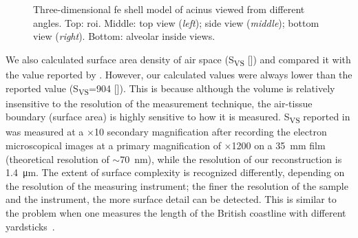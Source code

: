 \begin{figure}[htb]
%
	\caption[\threed \acs{fe} shell model of a partial acinus]{Three-dimensional \ac{fe} shell model of acinus viewed from different angles. Top: \ac{roi}. Middle: top view (\emph{left}); side view (\emph{middle}); bottom view (\emph{right}). Bottom: alveolar inside views.}
	\label{fig:alveolus}
\end{figure}%

We also calculated surface area density of air space (S\textsubscript{VS} [\centimetresquared\per\centimetrecubed]) and compared it with the value reported by \cite{Tschanz2003}. However, our calculated values were always lower than the reported value (S\textsubscript{VS}=904 [\centimetresquared\per\centimetrecubed]). This is because although the volume is relatively insensitive to the resolution of the measurement technique, the air-tissue boundary (surface area) is highly sensitive to how it is measured. S\textsubscript{VS} reported in \citet{Tschanz2003} was measured at a $\times$10 secondary magnification after recording the electron microscopical images at a primary magnification of $\times$1200 on a \SI{35}{\milli\meter} film (theoretical resolution of $\sim$\SI{70}{\nano\meter}), while the resolution of our \threed reconstruction is \SI{1.4}{\micro\meter}. The extent of surface complexity is recognized differently, depending on the resolution of the measuring instrument; the finer the resolution of the sample and the instrument, the more surface detail can be detected. This is similar to the problem when one measures the length of the British coastline with different yardsticks~\cite{Mandelbrot1967}.


